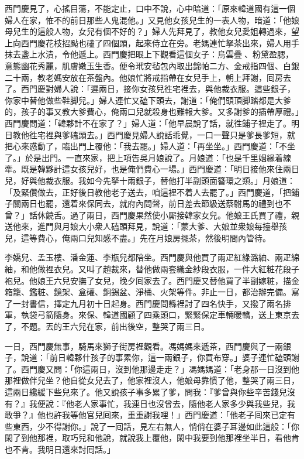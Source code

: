 西門慶見了，心搖目蕩，不能定止，口中不說，心中暗道：「原來韓道國有這一個婦人在家，恠不的前日那些人鬼混他。」{}又見他女孩兒生的一表人物，暗道：「他娘母兒生的這般人物，女兒有個不好的？」婦人先拜見了，教他女兒愛姐轉過來，望上向西門慶花枝招颭也磕了四個頭，起來侍立在旁。老媽連忙拏茶出來，婦人用手抹去盞上水漬，令他遞上。西門慶把眼上下觀看這個女子：烏雲疊𩬆、粉黛盈腮，意態幽花秀麗，肌膚嫩玉生香。便令玳安毡包內取出錦帕二方、金戒指四個、白銀二十兩，教老媽安放在茶盤內。他娘忙將戒指帶在女兒手上，朝上拜謝，囘房去了。西門慶對婦人說：「遲兩日，接你女孩兒徃宅裡去，與他裁衣服。這些銀子，你家中替他做些鞋脚兒。」婦人連忙又磕下頭去，謝道：「俺們頭頂脚踏都是大爹的，孩子的事又教大爹費心，俺兩口兒就殺身也難報大爹。{}又多謝爹的插帶厚禮。」西門慶問道：「韓夥計不在家了？」婦人道：「他早晨說了話，就徃鋪子裡走了。明日教他徃宅裡與爹磕頭去。」西門慶見婦人說話乖覺，一口一聲只是爹長爹短，就把心來惑動了，臨出門上覆他：「我去罷。」婦人道：「再坐坐。」西門慶道：「不坐了。」{}於是出門。一直來家，把上項告吳月娘說了。月娘道：「也是千里姻緣着線牽。既是韓夥計這女孩兒好，也是俺們費心一場。」西門慶道：「明日接他來住兩日兒，好與他裁衣服。我如今先拏十兩銀子，替他打半副頭面簪環之類。」月娘道：「及緊儹做去，正好後日教他老子送去，咱這裡不着人去罷了。」西門慶道，「把鋪子關兩日也罷，還着來保同去，就府內問聲，前日差去節級送蔡駙馬的禮到也不曾？」話休饒舌。過了兩日，西門慶果然使小厮接韓家女兒。他娘王氏買了禮，親送他來，進門與月娘大小衆人磕頭拜見，說道：「蒙大爹、大娘並衆娘每擡舉孩兒，這等費心，俺兩口兒知感不盡。」先在月娘房擺茶，然後明間內管待。

李嬌兒、孟玉樓、潘金蓮、李瓶兒都陪坐。西門慶與他買了兩疋紅綠潞紬、兩疋綿紬，和他做裡衣兒。又叫了趙裁來，替他做兩套織金紗段衣服，一件大紅粧花段子袍兒。他娘王六兒安撫了女兒，晚夕囘家去了。西門慶又替他買了半副嫁粧，描金箱籠、鑑粧、鏡架、盒礶、銅錫盆、淨桶、火架等件。非止一日，都治辦完備。寫了一封書信，擇定九月初十日起身。西門慶問縣裡討了四名快手，又撥了兩名排軍，執袋弓箭隨身。來保、韓道國顧了四乘頭口，緊緊保定車輛暖轎，送上東京去了，不題。丟的王六兒在家，前出後空，整哭了兩三日。

一日，西門慶無事，騎馬來獅子街房裡觀看。馮媽媽來遞茶，西門慶與了一兩銀子，說道：「前日韓夥什孩子的事累你，這一兩銀子，你買布穿。」婆子連忙磕頭謝了。西門慶又問：「你這兩日，沒到他那邊走走？」馮媽媽道：「老身那一日沒到他那裡做伴兒坐？他自從女兒去了，他家裡沒人，他娘母靠慣了他，整哭了兩三日，這兩日纔緩下些兒來了。他又說孩子事多累了爹，問我：『爹曾與你些辛苦錢兒沒有？』我便說：『他老人家事忙，我連日也沒曾去，隨他老人家多少與我些兒，我敢爭？』他也許我等他官兒囘來，重重謝我哩！」西門慶道：「他老子囘來已定有些東西，少不得謝你。」說了一囘話，見左右無人，悄俏在婆子耳邊如此這般：「你閑了到他那裡，取巧兒和他說，就說我上覆他，閑中我要到他那裡坐半日，看他肯也不肯。我明日還來討囘話。」

